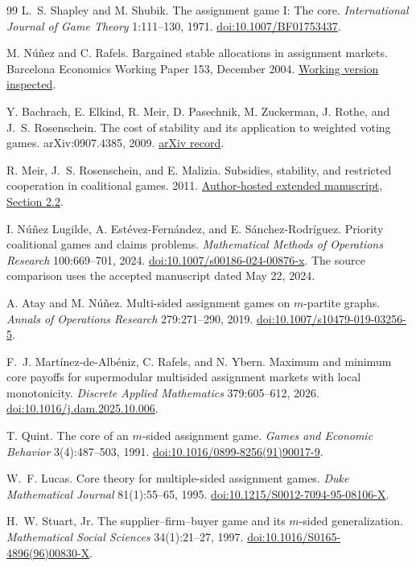 \documentclass[11pt]{article}
\theoremstyle{remark}
\begin{document}
\begin{thebibliography}{99}
\small
{}
L.~S. Shapley and M. Shubik.
The assignment game I: The core.
\emph{International Journal of Game Theory} 1:111--130, 1971.
\href{https://doi.org/10.1007/BF01753437}{doi:10.1007/BF01753437}.

M. N\'u\~nez and C. Rafels.
Bargained stable allocations in assignment markets.
Barcelona Economics Working Paper 153, December 2004.
\href{https://www.bse.eu/sites/default/files/working_paper_pdfs/153.pdf}{Working version inspected}.

Y. Bachrach, E. Elkind, R. Meir, D. Pasechnik, M. Zuckerman,
J. Rothe, and J.~S. Rosenschein.
The cost of stability and its application to weighted voting games.
arXiv:0907.4385, 2009.
\href{https://arxiv.org/abs/0907.4385}{arXiv record}.

R. Meir, J.~S. Rosenschein, and E. Malizia.
Subsidies, stability, and restricted cooperation in coalitional games.
2011. \href{https://www.cs.huji.ac.il/~jeff/papers/coopmas11meir.pdf}{Author-hosted extended manuscript, Section 2.2}.

I. N\'u\~nez Lugilde, A. Est\'evez-Fern\'andez, and E. S\'anchez-Rodr\'iguez.
Priority coalitional games and claims problems.
\emph{Mathematical Methods of Operations Research} 100:669--701, 2024.
\href{https://doi.org/10.1007/s00186-024-00876-x}{doi:10.1007/s00186-024-00876-x}.
The source comparison uses the accepted manuscript dated May 22, 2024.

A. Atay and M. N\'u\~nez.
Multi-sided assignment games on $m$-partite graphs.
\emph{Annals of Operations Research} 279:271--290, 2019.
\href{https://doi.org/10.1007/s10479-019-03256-5}{doi:10.1007/s10479-019-03256-5}.

F.~J. Mart\'inez-de-Alb\'eniz, C. Rafels, and N. Ybern.
Maximum and minimum core payoffs for supermodular multisided assignment
markets with local monotonicity.
\emph{Discrete Applied Mathematics} 379:605--612, 2026.
\href{https://doi.org/10.1016/j.dam.2025.10.006}{doi:10.1016/j.dam.2025.10.006}.

T. Quint. The core of an $m$-sided assignment game.
\emph{Games and Economic Behavior} 3(4):487--503, 1991.
\href{https://doi.org/10.1016/0899-8256(91)90017-9}{doi:10.1016/0899-8256(91)90017-9}.

W.~F. Lucas. Core theory for multiple-sided assignment games.
\emph{Duke Mathematical Journal} 81(1):55--65, 1995.
\href{https://doi.org/10.1215/S0012-7094-95-08106-X}{doi:10.1215/S0012-7094-95-08106-X}.

H.~W. Stuart, Jr. The supplier--firm--buyer game and its $m$-sided generalization.
\emph{Mathematical Social Sciences} 34(1):21--27, 1997.
\href{https://doi.org/10.1016/S0165-4896(96)00830-X}{doi:10.1016/S0165-4896(96)00830-X}.
\end{thebibliography}
\end{document}
